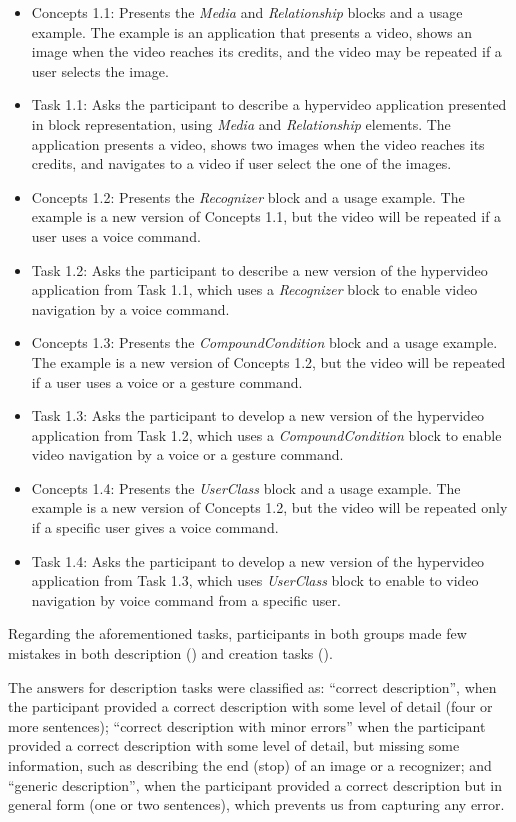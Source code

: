 \begin{itemize}
	\item Concepts 1.1: Presents the \textit{Media} and \textit{Relationship}
	blocks and a usage example. The example is an application that presents a
	video, shows an image when the video reaches its credits, and the video may be
	repeated if a user selects the image.
	\item Task 1.1: Asks the participant to describe a hypervideo application
	presented in block representation, using \textit{Media} and
	\textit{Relationship} elements. The application presents a video, shows two
	images when the video reaches its credits, and navigates to a video if user
	select the one of the images.
	\item Concepts 1.2: Presents the \textit{Recognizer} block and a usage
	example. The example is a new version of Concepts 1.1, but the video will be
	repeated if a user uses a voice command.
	\item Task 1.2: Asks the participant to describe a new version of the
	hypervideo application from Task 1.1, which uses a \textit{Recognizer} block
	to enable video navigation by a voice command.
	\item Concepts 1.3: Presents the \textit{CompoundCondition} block and a usage
	example. The example is a new version of Concepts 1.2, but the video will be
	repeated if a user uses a voice or a gesture command.
	\item Task 1.3: Asks the participant to develop a new version of the
	hypervideo application from Task 1.2, which uses a \textit{CompoundCondition}
	block to enable video navigation by a voice or a gesture command.
	\item Concepts 1.4: Presents the \textit{UserClass} block and a usage example.
	The example is a new version of Concepts 1.2, but the video will be repeated
	only if a specific user gives a voice command.
	\item Task 1.4: Asks the participant to develop a new version of the
	hypervideo application from Task 1.3, which uses \textit{UserClass} block to
	enable to video navigation by voice command from a specific user.
\end{itemize}

Regarding the aforementioned tasks, participants in both groups made few
mistakes in both description () and creation tasks
().

The answers for description tasks were classified as: “correct description”,
when the participant provided a correct description with some level of detail
(four or more sentences); “correct description with minor errors” when the
participant provided a correct description with some level of detail, but
missing some information, such as describing the end (stop) of an image or a
recognizer; and “generic description”, when the participant provided a correct
description but in general form (one or two sentences), which prevents us from
capturing any error.


